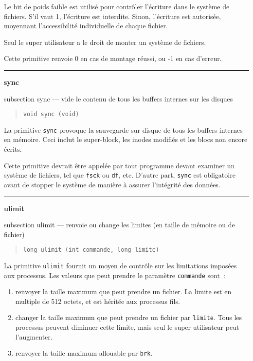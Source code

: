 \documentclass [twoside] {report}
\newcommand {\primitive} [1]
    {
	{\large \bf #1}
	\addcontentsline {toc} {subsection} {#1}
    }
\newcommand {\separation}
    {
	\vspace {7mm}
	\nopagebreak
	\hrule
    }
\begin{document}
Le bit de poids faible est utilisé pour contrôler
l'écriture dans le système de fichiers. S'il vaut
1, l'écriture est interdite. Sinon, l'écriture est
autorisée, moyennant l'accessibilité individuelle
de chaque fichier.

Seul le super utilisateur a le droit de monter un
système de fichiers.

Cette primitive renvoie 0 en cas de montage
réussi, ou -1 en cas d'erreur.




\separation
\primitive {sync} --- vide le contenu de tous les buffers internes sur les disques

\begin {quote}
\begin {verbatim}
void sync (void)
\end{verbatim}
\end {quote}

La primitive {\tt sync} provoque la sauvegarde sur
disque de tous les buffers internes en mémoire.
Ceci inclut le super-block, les inodes modifiés et
les blocs non encore écrits.

Cette primitive devrait être appelée par tout
programme devant examiner un système de fichiers,
tel que {\tt fsck} ou {\tt df}, etc. D'autre part,
{\tt sync} est obligatoire avant de stopper le
système de manière à assurer l'intégrité des
données.




\separation
\primitive {ulimit} --- renvoie ou change les limites (en taille de mémoire ou de fichier)

\begin {quote}
\begin {verbatim}
long ulimit (int commande, long limite)
\end{verbatim}
\end {quote}

La primitive {\tt ulimit} fournit un moyen de
contrôle sur les limitations imposées aux
processus. Les valeurs que peut prendre le
paramètre {\tt commande} sont~:

\begin {enumerate}
    \item renvoyer la taille maximum que peut prendre
	un fichier. La limite est en multiple de 512
	octets, et est héritée aux processus fils.
    \item changer la taille maximum que peut prendre
	un fichier par {\tt limite}. Tous les processus
	peuvent diminuer cette limite, mais seul le super
	utilisateur peut l'augmenter.
    \item renvoyer la taille maximum allouable par {\tt brk}.
\end {enumerate}
\end{document}
